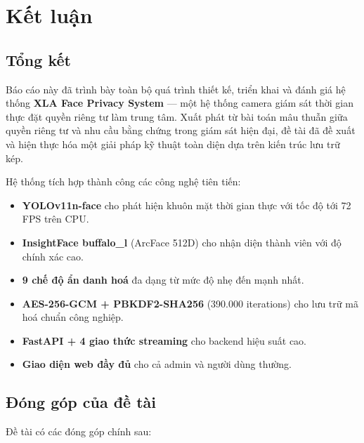 \section{Kết luận}
\label{sec:ketluan}

\subsection{Tổng kết}
\label{subsec:tongket}

Báo cáo này đã trình bày toàn bộ quá trình thiết kế, triển khai và đánh giá hệ thống \textbf{XLA Face Privacy System} --- một hệ thống camera giám sát thời gian thực đặt quyền riêng tư làm trung tâm. Xuất phát từ bài toán mâu thuẫn giữa quyền riêng tư và nhu cầu bằng chứng trong giám sát hiện đại, đề tài đã đề xuất và hiện thực hóa một giải pháp kỹ thuật toàn diện dựa trên kiến trúc lưu trữ kép.

\medskip
Hệ thống tích hợp thành công các công nghệ tiên tiến:
\begin{itemize}
    \item \textbf{YOLOv11n-face} cho phát hiện khuôn mặt thời gian thực với tốc độ tới 72 FPS trên CPU.
    \item \textbf{InsightFace buffalo\_l} (ArcFace 512D) cho nhận diện thành viên với độ chính xác cao.
    \item \textbf{9 chế độ ẩn danh hoá} đa dạng từ mức độ nhẹ đến mạnh nhất.
    \item \textbf{AES-256-GCM + PBKDF2-SHA256} (390.000 iterations) cho lưu trữ mã hoá chuẩn công nghiệp.
    \item \textbf{FastAPI + 4 giao thức streaming} cho backend hiệu suất cao.
    \item \textbf{Giao diện web đầy đủ} cho cả admin và người dùng thường.
\end{itemize}

\subsection{Đóng góp của đề tài}
\label{subsec:donggop}

Đề tài có các đóng góp chính sau:

